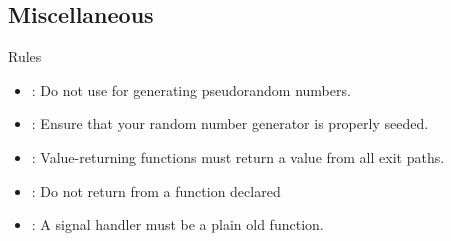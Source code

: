 \subsection{Miscellaneous}

\begin{frame}[t]{Rules}
\begin{itemize}
  \item {}: 
        Do not use  for generating pseudorandom numbers.
  \vfill
  \item {}: 
        Ensure that your random number generator is properly seeded.
  \vfill
  \item {}: 
        Value-returning functions must return a value from all exit paths.
  \vfill
  \item {}: 
        Do not return from a function declared \cppkey{[[noreturn]]}
  \vfill
  \item {}: 
        A signal handler must be a plain old function.
\end{itemize}
\end{frame}


